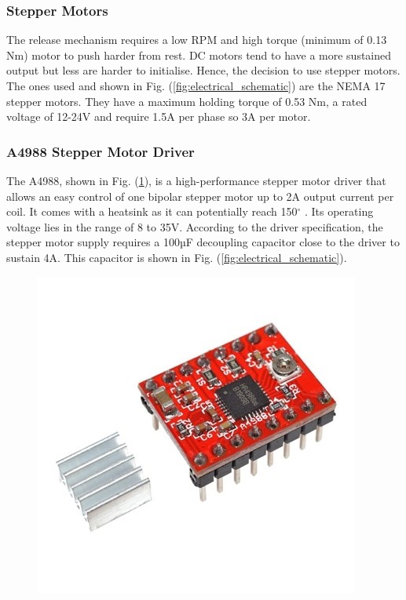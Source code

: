 \documentclass[11pt,landscape]{article}
\begin{document}
\begin{multicols}{3}
\subsubsection{Stepper Motors}
The release mechanism requires a low RPM and high torque (minimum of 0.13 Nm)
motor to push harder from rest. DC motors tend to have a more sustained output
but less are harder to initialise. Hence, the decision to use stepper motors.
The ones used and shown in Fig. (\ref{fig:electrical_schematic}) are the NEMA 17
stepper motors. They have a maximum holding torque of 0.53 Nm, a rated voltage
of 12-24V and require 1.5A per phase so 3A per motor. 

\subsubsection{A4988 Stepper Motor Driver}
The A4988, shown in Fig. (\ref{fig:stepper_driver}), is a high-performance
stepper motor driver that allows an easy control of one bipolar stepper motor up
to 2A output current per coil. It comes with a heatsink as it can potentially
reach 150$^{\circ}$ \cite{stepper_driver}.
Its operating voltage lies in the range of 8 to 35V. According to the driver
specification, the stepper motor supply requires a 100µF decoupling capacitor
close to the driver to sustain 4A. This capacitor is shown in Fig.
(\ref{fig:electrical_schematic}).

\begin{figure}[H]
    \begin{center}
    \includegraphics[]{stepper_driver.jpg}
    \label{fig:stepper_driver}
    \end{center}
\end{figure}


\end{multicols}
\end{document}
